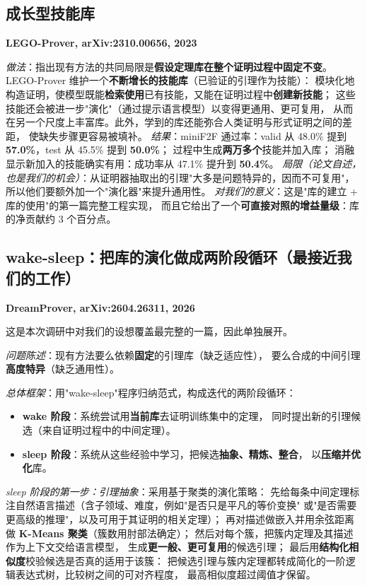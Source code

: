 \documentclass[UTF8,a4paper,11pt,fontset=windows]{ctexart}
\newcommand{\paper}[1]{\par\medskip\noindent\textbf{\color{sgblue!80!black}#1}\par\nobreak\vspace{1pt}}
\newcommand{\field}[1]{\textit{#1}：}
\begin{document}
\subsection{成长型技能库}

\paper{LEGO-Prover, arXiv:2310.00656, 2023}
\field{做法}指出现有方法的共同局限是\textbf{假设定理库在整个证明过程中固定不变}。
LEGO-Prover 维护一个\textbf{不断增长的技能库}（已验证的引理作为技能）：
模块化地构造证明，使模型既能\textbf{检索使用}已有技能，又能在证明过程中\textbf{创建新技能}；
这些技能还会被进一步"演化"（通过提示语言模型）以变得更通用、更可复用，
从而在另一个尺度上丰富库。此外，学到的库还能弥合人类证明与形式证明之间的差距，
使缺失步骤更容易被填补。
\field{结果}miniF2F 通过率：valid 从 48.0\% 提到 \textbf{57.0\%}，test 从 45.5\% 提到 \textbf{50.0\%}；
过程中生成\textbf{两万多个}技能并加入库；
消融显示新加入的技能确实有用：成功率从 47.1\% 提升到 \textbf{50.4\%}。
\field{局限（论文自述，也是我们的机会）}从证明器抽取出的引理"大多是问题特异的，因而不可复用"，
所以他们要额外加一个"演化器"来提升通用性。
\field{对我们的意义}这是"库的建立 + 库的使用"的第一篇完整工程实现，
而且它给出了一个\textbf{可直接对照的增益量级}：库的净贡献约 3 个百分点。

\subsection{wake-sleep：把库的演化做成两阶段循环（最接近我们的工作）}

\paper{DreamProver, arXiv:2604.26311, 2026}

这是本次调研中对我们的设想覆盖最完整的一篇，因此单独展开。

\field{问题陈述}现有方法要么依赖\textbf{固定}的引理库（缺乏适应性），
要么合成的中间引理\textbf{高度特异}（缺乏通用性）。

\field{总体框架}用"wake-sleep"程序归纳范式，构成迭代的两阶段循环：

\begin{itemize}[leftmargin=1.5em,itemsep=2pt]
  \item \textbf{wake 阶段}：系统尝试用\textbf{当前库}去证明训练集中的定理，
        同时提出新的引理候选（来自证明过程中的中间定理）。
  \item \textbf{sleep 阶段}：系统从这些经验中学习，把候选\textbf{抽象、精炼、整合}，
        以\textbf{压缩并优化}库。
\end{itemize}

\field{sleep 阶段的第一步：引理抽象}采用基于聚类的演化策略：
先给每条中间定理标注自然语言描述（含子领域、难度，例如"是否只是平凡的等价变换"
或"是否需要更高级的推理"，以及可用于其证明的相关定理）；
再对描述做嵌入并用余弦距离做 \textbf{K-Means 聚类}（簇数用肘部法确定）；
然后对每个簇，把簇内定理及其描述作为上下文交给语言模型，
生成\textbf{更一般、更可复用}的候选引理；
最后用\textbf{结构化相似度}校验候选是否真的适用于该簇：
把候选引理与簇内定理都转成简化的一阶逻辑表达式树，比较树之间的可对齐程度，
最高相似度超过阈值才保留。
\end{document}
